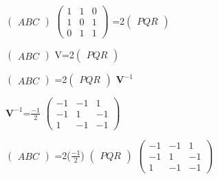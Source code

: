 \documentclass[10pt,a4paper]{report}
\let\vec\mathbf
\begin{document}
\begin{multicols}{2}
\begin{center}
\end{center}
\begin{center}
$ \begin{pmatrix} 
A
B
C
\end{pmatrix} $ 
$ \begin{pmatrix} 
1 & 1 & 0 \\
1 & 0 & 1 \\
0 & 1 & 1
\end{pmatrix} $ =2$ \begin{pmatrix} 
P 
Q
R
\end{pmatrix} $ \\
\end{center}
\begin{center}
$ \begin{pmatrix} 
A
B
C
\end{pmatrix} $ 
V=2$ \begin{pmatrix} 
P 
Q 
R
\end{pmatrix} $ \\
\end{center}
\begin{center}
$ \begin{pmatrix} 
A
B
C
\end{pmatrix} $ 
=2$ \begin{pmatrix} 
P 
Q 
R
\end{pmatrix} $ 
$\vec{V}^{-1}$\\
\end{center}
\begin{center}
$\vec{V}^{-1}$=$\frac{-1}{2}$
$ \begin{pmatrix} 
-1 & -1 & 1 \\
-1 & 1 & -1 \\
1 & -1 & -1
\end{pmatrix} $ \\
\end{center}
\begin{center}
$ \begin{pmatrix} 
A
B
C
\end{pmatrix} $ 
	=2($\frac{-1}{2}$) $ \begin{pmatrix} 
P 
Q 
R
\end{pmatrix} $ 
$ \begin{pmatrix} 
-1 & -1 & 1 \\
-1 & 1 & -1 \\
1 & -1 & -1
\end{pmatrix} $\\
\end{center}
\begin{center}

\end{center}
\end{multicols}
\end{document}
